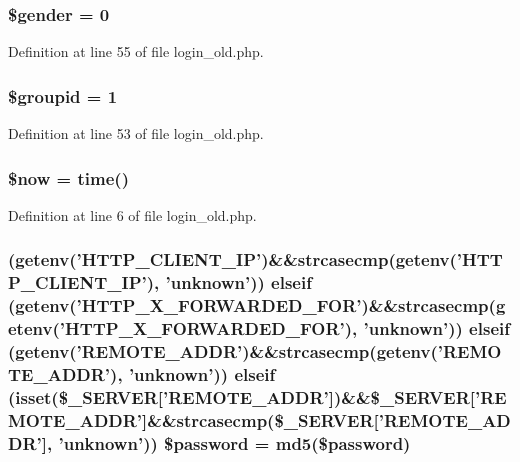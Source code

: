 \hypertarget{login__old_8php_a0f1d7cfb9dc6f494b9014885205fc47e}{
\subsubsection[{\$gender}]{\setlength{\rightskip}{0pt plus 5cm}\$gender = 0}}\label{login__old_8php_a0f1d7cfb9dc6f494b9014885205fc47e}


Definition at line 55 of file login\+\_\+old.\+php.

\hypertarget{login__old_8php_acb3c80fc595983cc4ebdb2d266044fcd}{
\subsubsection[{\$groupid}]{\setlength{\rightskip}{0pt plus 5cm}\$groupid = 1}}\label{login__old_8php_acb3c80fc595983cc4ebdb2d266044fcd}


Definition at line 53 of file login\+\_\+old.\+php.

\hypertarget{login__old_8php_af1d5ccdee975b8f4d20aaffc5b28557c}{
\subsubsection[{\$now}]{\setlength{\rightskip}{0pt plus 5cm}\$now = time()}}\label{login__old_8php_af1d5ccdee975b8f4d20aaffc5b28557c}


Definition at line 6 of file login\+\_\+old.\+php.

\hypertarget{login__old_8php_a24685489bad7fe10f40dcbead27d5e3e}{
\subsubsection[{\$password}]{ (getenv('H\+T\+T\+P\+\_\+\+C\+L\+I\+E\+N\+T\+\_\+\+I\+P')\&\&strcasecmp(getenv('H\+T\+T\+P\+\_\+\+C\+L\+I\+E\+N\+T\+\_\+\+I\+P'), 'unknown')) {\bf elseif} (getenv('H\+T\+T\+P\+\_\+\+X\+\_\+\+F\+O\+R\+W\+A\+R\+D\+E\+D\+\_\+\+F\+O\+R')\&\&strcasecmp(getenv('H\+T\+T\+P\+\_\+\+X\+\_\+\+F\+O\+R\+W\+A\+R\+D\+E\+D\+\_\+\+F\+O\+R'), 'unknown')) {\bf elseif} (getenv('R\+E\+M\+O\+T\+E\+\_\+\+A\+D\+D\+R')\&\&strcasecmp(getenv('R\+E\+M\+O\+T\+E\+\_\+\+A\+D\+D\+R'), 'unknown')) {\bf elseif} (isset(\$\+\_\+\+S\+E\+R\+V\+E\+R\mbox{[}'R\+E\+M\+O\+T\+E\+\_\+\+A\+D\+D\+R'\mbox{]})\&\&\$\+\_\+\+S\+E\+R\+V\+E\+R\mbox{[}'R\+E\+M\+O\+T\+E\+\_\+\+A\+D\+D\+R'\mbox{]}\&\&strcasecmp(\$\+\_\+\+S\+E\+R\+V\+E\+R\mbox{[}'R\+E\+M\+O\+T\+E\+\_\+\+A\+D\+D\+R'\mbox{]}, 'unknown')) \$password = md5(\$password)}}\label{login__old_8php_a24685489bad7fe10f40dcbead27d5e3e}


